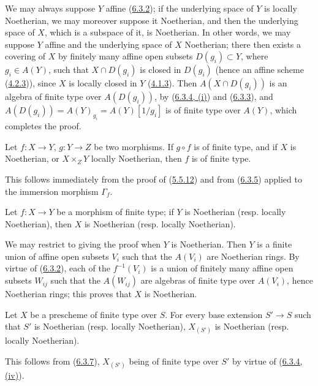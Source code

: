 We may always suppose $Y$ affine (\hyperref[I.6.3.2]{6.3.2}); if
the underlying space of $Y$ is locally Noetherian, we may moreover
suppose it Noetherian, and then the underlying space of $X$, which is a
subspace of it, is Noetherian. In other words, we may suppose $Y$ affine and
the underlying space of $X$ Noetherian; there then exists a covering of $X$
by finitely many affine open subsets $D(g_i)\subset Y$, where $g_i\in A(Y)$,
such that $X\cap D(g_i)$ is closed in $D(g_i)$ (hence an affine scheme
(\hyperref[I.4.2.3]{4.2.3})), since $X$ is locally closed in $Y$
(\hyperref[I.4.1.3]{4.1.3}). Then $A(X\cap D(g_i))$ is an algebra of
finite type over $A(D(g_i))$, by (\hyperref[I.6.3.4]{6.3.4, (i)}) and
(\hyperref[I.6.3.3]{6.3.3}), and
$A(D(g_i))=A(Y)_{g_i}=A(Y)[1/g_i]$ is of finite type over $A(Y)$, which
completes the proof.

\begin{corollary}[6.3.6]
\label{I.6.3.6}
Let $f:X\to Y$, $g:Y\to Z$ be two morphisms. If $g\circ f$ is of finite type,
and if $X$ is Noetherian, or $X\times_Z Y$ locally Noetherian, then $f$ is of
finite type.
\end{corollary}

This follows immediately from the proof of
(\hyperref[I.5.5.12]{5.5.12}) and from (\hyperref[I.6.3.5]{6.3.5})
applied to the immersion morphism $\Gamma_f$.

\begin{proposition}[6.3.7]
\label{I.6.3.7}
Let $f:X\to Y$ be a morphism of finite type; if $Y$ is Noetherian (resp.
locally Noetherian), then $X$ is Noetherian (resp. locally Noetherian).
\end{proposition}

We may restrict to giving the proof when $Y$ is Noetherian. Then $Y$
is a finite union of affine open subsets $V_i$ such that the $A(V_i)$ are
Noetherian rings. By virtue of (\hyperref[I.6.3.2]{6.3.2}), each of the
$f^{-1}(V_i)$ is a union of finitely many affine open subsets $W_{ij}$ such
that the $A(W_{ij})$ are algebras of finite type over $A(V_i)$, hence
Noetherian rings; this proves that $X$ is Noetherian.

\begin{corollary}[6.3.8]
\label{I.6.3.8}
Let $X$ be a prescheme of finite type over $S$. For every base extension
$S'\to S$ such that $S'$ is Noetherian (resp. locally Noetherian),
$X_{(S')}$ is Noetherian (resp. locally Noetherian).
\end{corollary}

This follows from (\hyperref[I.6.3.7]{6.3.7}), $X_{(S')}$ being of finite
type over $S'$ by virtue of (\hyperref[I.6.3.4]{6.3.4, (iv)}).

